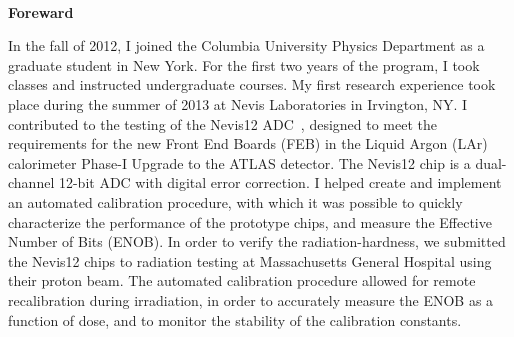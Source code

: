 ~\\[1in] %
\textbf{\Huge Foreward}\bigskip

\noindent 

In the fall of 2012, I joined the Columbia University Physics Department as a graduate student in New York. For the first two years of the program, I took classes and instructed undergraduate courses. 
My first research experience took place during the summer of 2013 at Nevis Laboratories in Irvington, NY. I contributed to the testing of the Nevis12 ADC~\cite{Nevis12_paper}, designed to meet the requirements
for the new Front End Boards (FEB) in the Liquid Argon (LAr) calorimeter Phase-I Upgrade to the ATLAS detector.
The Nevis12 chip is a dual-channel 12-bit ADC with digital error correction. I helped create and implement an automated calibration procedure, with which it was possible to quickly characterize the performance of the prototype chips, and measure the Effective Number of Bits (ENOB). In order to verify the radiation-hardness, we submitted the Nevis12 chips to radiation testing at Massachusetts General Hospital using their proton beam. The automated calibration procedure allowed for remote recalibration during irradiation, in order to accurately measure the ENOB as a function of dose, and to monitor the stability of the calibration constants. 

